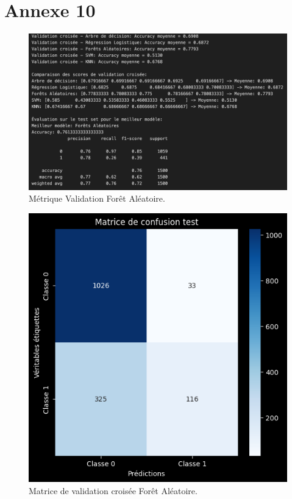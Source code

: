 \section*{Annexe 10}
\label{sec:annexe10}
\begin{figure}[H]
\centering
\includegraphics[width=1\textwidth]{figures/Annexe10.png}
\caption{Métrique Validation Forêt Aléatoire.}
\label{fig:annexe10}
\end{figure}

\begin{figure}[H]
\centering
\includegraphics[width=1\textwidth]{figures/MatriceVC1.png}
\caption{Matrice de validation croisée Forêt Aléatoire.}
\end{figure}


